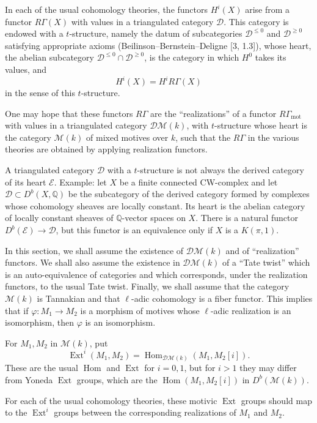 \documentclass[11pt,a4paper]{article}
\theoremstyle{plain}
\theoremstyle{definition}
\DeclareMathOperator{\Ext}{Ext}
\DeclareMathOperator{\Hom}{Hom}
\newcommand{\Q}{\mathbb{Q}}
\DeclareMathOperator{\mot}{mot}
\begin{document}
In each of the usual cohomology theories, the functors $H^i(X)$ arise from a functor $R\Gamma(X)$ with values in a triangulated category $\mathscr{D}$. This category is endowed with a $t$-structure, namely the datum of subcategories $\mathscr{D}^{\leq0}$ and $\mathscr{D}^{\geq0}$ satisfying appropriate axioms (Beilinson--Bernstein--Deligne [3, 1.3]), whose heart, the abelian subcategory $\mathscr{D}^{\leq0}\cap\mathscr{D}^{\geq0}$, is the category in which $H^0$ takes its values, and
$$
H^i(X)=H^i R\Gamma(X)
$$
in the sense of this $t$-structure.

One may hope that these functors $R\Gamma$ are the ``realizations'' of a functor $R\Gamma_{\mot}$ with values in a triangulated category $\mathscr{D}\mathcal{M}(k)$, with $t$-structure whose heart is the category $\mathcal{M}(k)$ of mixed motives over $k$, such that the $R\Gamma$ in the various theories are obtained by applying realization functors.

A triangulated category $\mathscr{D}$ with a $t$-structure is not always the derived category of its heart $\mathcal{E}$. Example: let $X$ be a finite connected CW-complex and let $\mathscr{D}\subset D^b(X,\Q)$ be the subcategory of the derived category formed by complexes whose cohomology sheaves are locally constant. Its heart is the abelian category of locally constant sheaves of $\Q$-vector spaces on $X$. There is a natural functor $D^b(\mathcal{E})\to\mathscr{D}$, but this functor is an equivalence only if $X$ is a $K(\pi,1)$.

In this section, we shall assume the existence of $\mathscr{D}\mathcal{M}(k)$ and of ``realization'' functors. We shall also assume the existence in $\mathscr{D}\mathcal{M}(k)$ of a ``Tate twist'' which is an auto-equivalence of categories and which corresponds, under the realization functors, to the usual Tate twist. Finally, we shall assume that the category $\mathcal{M}(k)$ is Tannakian and that $\ell$-adic cohomology is a fiber functor. This implies that if $\varphi:M_1\to M_2$ is a morphism of motives whose $\ell$-adic realization is an isomorphism, then $\varphi$ is an isomorphism.

For $M_1,M_2$ in $\mathcal{M}(k)$, put
$$
\Ext^i(M_1,M_2)=\Hom_{\mathscr{D}\mathcal{M}(k)}(M_1,M_2[i]).
$$
These are the usual $\Hom$ and $\Ext$ for $i=0,1$, but for $i>1$ they may differ from Yoneda $\Ext$ groups, which are the $\Hom(M_1,M_2[i])$ in $D^b(\mathcal{M}(k))$.

For each of the usual cohomology theories, these motivic $\Ext$ groups should map to the $\Ext^i$ groups between the corresponding realizations of $M_1$ and $M_2$.
\end{document}
